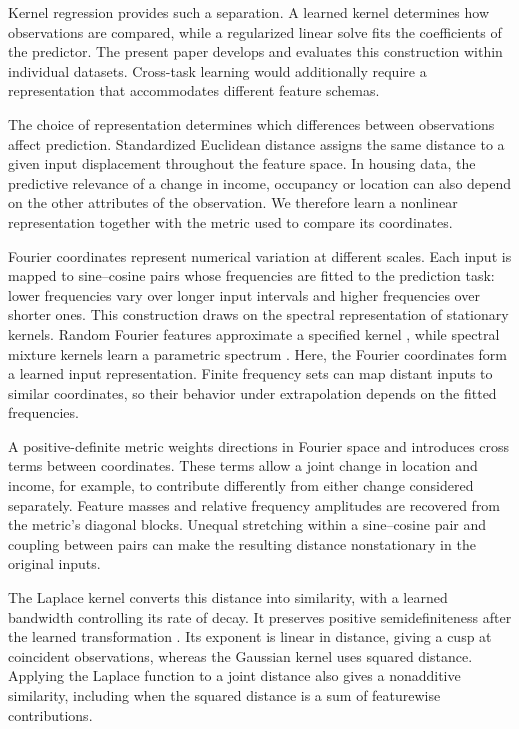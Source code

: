 \documentclass[11pt]{article}
\begin{document}
Kernel regression provides such a separation. A learned kernel determines how observations are compared, while a regularized linear solve fits the coefficients of the predictor. The present paper develops and evaluates this construction within individual datasets. Cross-task learning would additionally require a representation that accommodates different feature schemas.

The choice of representation determines which differences between observations affect prediction. Standardized Euclidean distance assigns the same distance to a given input displacement throughout the feature space. In housing data, the predictive relevance of a change in income, occupancy or location can also depend on the other attributes of the observation. We therefore learn a nonlinear representation together with the metric used to compare its coordinates.

Fourier coordinates represent numerical variation at different scales. Each input is mapped to sine--cosine pairs whose frequencies are fitted to the prediction task: lower frequencies vary over longer input intervals and higher frequencies over shorter ones. This construction draws on the spectral representation of stationary kernels. Random Fourier features approximate a specified kernel \cite{rahimi2007}, while spectral mixture kernels learn a parametric spectrum \cite{wilson2013}. Here, the Fourier coordinates form a learned input representation. Finite frequency sets can map distant inputs to similar coordinates, so their behavior under extrapolation depends on the fitted frequencies.

A positive-definite metric weights directions in Fourier space and introduces cross terms between coordinates. These terms allow a joint change in location and income, for example, to contribute differently from either change considered separately. Feature masses and relative frequency amplitudes are recovered from the metric's diagonal blocks. Unequal stretching within a sine--cosine pair and coupling between pairs can make the resulting distance nonstationary in the original inputs.

The Laplace kernel converts this distance into similarity, with a learned bandwidth controlling its rate of decay. It preserves positive semidefiniteness after the learned transformation \cite[Theorem~1 and Corollary~1]{schoenberg1938}. Its exponent is linear in distance, giving a cusp at coincident observations, whereas the Gaussian kernel uses squared distance. Applying the Laplace function to a joint distance also gives a nonadditive similarity, including when the squared distance is a sum of featurewise contributions.
\end{document}
